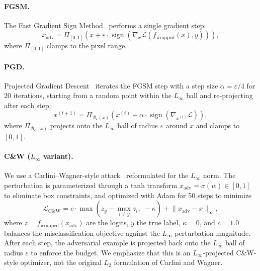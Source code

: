 \documentclass[11pt]{article}
\newcommand{\eps}{\varepsilon}
\begin{document}
\paragraph{FGSM.}
The Fast Gradient Sign Method~\cite{goodfellow2015fgsm} performs a single
gradient step:
\begin{equation}
  x_{\text{adv}} = \Pi_{[0,1]}\!\left(x + \eps \cdot \operatorname{sign}\!\left(\nabla_x \mathcal{L}(f_{\text{wrapped}}(x), y)\right)\right),
\end{equation}
where $\Pi_{[0,1]}$ clamps to the pixel range.

\paragraph{PGD.}
Projected Gradient Descent~\cite{madry2018pgd} iterates the FGSM step with
a step size $\alpha = \eps / 4$ for 20 iterations, starting from a random
point within the $L_\infty$ ball and re-projecting after each step:
\begin{equation}
  x^{(t+1)} = \Pi_{\mathcal{B}_\eps(x)}\!\left(x^{(t)} + \alpha \cdot \operatorname{sign}\!\left(\nabla_{x^{(t)}} \mathcal{L}\right)\right),
\end{equation}
where $\Pi_{\mathcal{B}_\eps(x)}$ projects onto the $L_\infty$ ball of
radius $\eps$ around $x$ and clamps to $[0,1]$.

\paragraph{C\&W ($L_\infty$ variant).}
We use a Carlini--Wagner-style attack~\cite{carlini2017cw} reformulated
for the $L_\infty$ norm. The perturbation is parameterized through a
tanh transform $x_{\text{adv}} = \sigma(w) \in [0,1]$ to eliminate box
constraints, and optimized with Adam for 50 steps to minimize
\begin{equation}
  \mathcal{L}_{\text{C\&W}} = c \cdot \max\!\left( z_y - \max_{i \neq y} z_i,\; -\kappa \right) + \lVert x_{\text{adv}} - x \rVert_\infty,
  \label{eq:cw}
\end{equation}
where $z = f_{\text{wrapped}}(x_{\text{adv}})$ are the logits, $y$ the
true label, $\kappa = 0$, and $c = 1.0$ balances the misclassification
objective against the $L_\infty$ perturbation magnitude. After each step,
the adversarial example is projected back onto the $L_\infty$ ball of
radius $\eps$ to enforce the budget. We emphasize that this is an
$L_\infty$-projected C\&W-style optimizer, not the original $L_2$
formulation of Carlini and Wagner.
\end{document}
